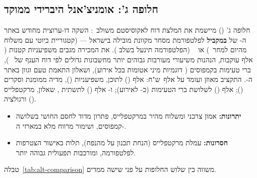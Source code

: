 \subsection{חלופה ג': אומניצ'אנל היברידי ממוקד}
\label{subsec:alt-hybrid}

חלופה ג' () מיישמת את המלצת דוח  לאקוסיסטם
משולב~\cite{mckinsey2025beauty}: השקה דו-ערוצית מחודש  באתר ה-
של  \textbf{במקביל} לפלטפורמת מסחר מקוונת מובילה בישראל ---
 (קטגוריית ביוטי עם משלוח מהיום למחר~\cite{terminalx2026beauty})
או ~\cite{superpharm2026marketplace} (הפלטפורמה תינעל
בשלב ). את המכירה מגבים  משפיעניות קטנות ( אלף
עוקבות, הנהנות משיעורי מעורבות גבוהים יותר מחשבונות גדולים לפי דוח הענף של
~\cite{hypeauditor2025state}),  ברי טעימות בקמפוסים
( דוגמיות מיני אטומות בכל אירוע), ושאלון התאמת טעם וגוון באתר ה-.
התקציב מאוזן ועומד על  אלף~ש"ח:  אלף () לתוכן,
משפיעניות (), מדיה ממומנת וסקרים ();  אלף
() לשלושת ברי הטעימות (כ- לאירוע); ו- אלף
() לתשתית , שאלון, מרקטפלייס ורגולציה ().

\begin{itemize}
  \item \textbf{יתרונות:} אמון צרכני ומשלוח מהיר במרקטפלייס, פתרון מדוד לחסם
    החושי בשלושה קמפוסים, ושימור מרווח מלא במארזי ה-.
  \item \textbf{חסרונות:} עמלת מרקטפלייס (הנחת תכנון  על 
    מהנפח), תלות באישור הצטרפות לפלטפורמה, ומורכבות תפעולית גבוהה יותר.
\end{itemize}

טבלה~\ref{tab:alt-comparison} משווה בין שלוש החלופות על פני שישה ממדים.

